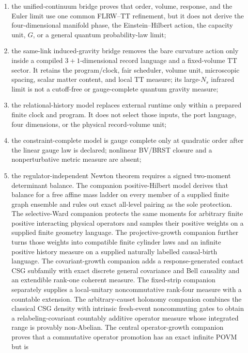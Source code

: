 \begin{enumerate}
\item the unified-continuum bridge proves that order, volume, response, and
the Euler limit use one common FLRW--TT refinement, but it does not derive
the four-dimensional manifold phase, the Einstein--Hilbert action, the
capacity unit, \(G\), or a general quantum probability-law limit;
\item the same-link induced-gravity bridge removes the bare curvature action
only inside a compiled \(3+1\)-dimensional record language and a fixed-volume
TT sector.  It retains the program/clock, fair scheduler, volume unit,
microscopic spacing, scalar matter content, and local TT measure; its
large-\(N_s\) infrared limit is not a cutoff-free or gauge-complete quantum
gravity measure;
\item the relational-history model replaces external runtime only within a
prepared finite clock and program.  It does not select those inputs, the port
language, four dimensions, or the physical record-volume unit;
\item the constraint-complete model is gauge complete only at quadratic
order after the linear gauge law is declared; nonlinear BV/BRST closure and
a nonperturbative metric measure are absent;
\item the regulator-independent Newton theorem requires a signed
two-moment determinant balance.  The companion positive-Hilbert model
derives that balance for a free affine mass ladder on every member of a
supplied finite graph ensemble and rules out exact all-level pairing as the
sole protection.  The selective-Ward companion protects the same moments
for arbitrary finite positive interacting physical operators and samples
their positive weights on a supplied finite geometry language.  The
projective-growth companion further turns those weights into compatible
finite cylinder laws and an infinite positive history measure on a supplied
naturally labelled causal-birth language.  The covariant-growth companion
adds a response-generated contact CSG subfamily with exact discrete general
covariance and Bell causality and an extendible rank-one coherent measure.
The fixed-strip companion separately supplies a local-unitary
noncommutative rank-four measure with a countable extension.  The
arbitrary-causet holonomy companion combines the classical CSG density
with intrinsic fresh-event noncommuting gates to obtain a
relabeling-covariant countably additive operator measure whose integrated
range is provably non-Abelian.  The central operator-growth companion proves
that a commutative operator promotion has an exact infinite POVM but is

\end{enumerate}
